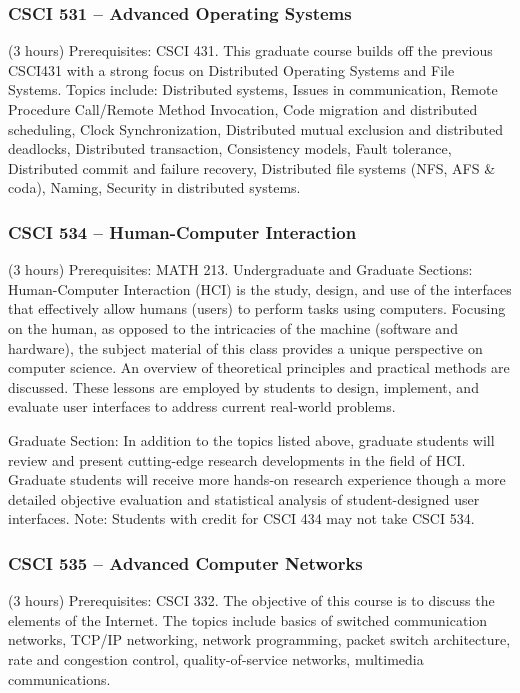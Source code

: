 \subsubsection{CSCI 531 -- Advanced Operating Systems}
(3 hours) Prerequisites: CSCI 431. This graduate course builds off the previous CSCI431 with a strong focus on Distributed Operating Systems and File Systems.  Topics include:  Distributed systems, Issues in communication, Remote Procedure Call/Remote Method Invocation, Code migration and distributed scheduling, Clock Synchronization, Distributed mutual exclusion and distributed deadlocks, Distributed transaction, Consistency models, Fault tolerance, Distributed commit and failure recovery, Distributed file systems (NFS, AFS \& coda), Naming, Security in distributed systems.

\subsubsection{CSCI 534 -- Human-Computer Interaction}
(3 hours) Prerequisites: MATH 213. Undergraduate and Graduate Sections: Human-Computer Interaction (HCI) is the study, design, and use of the interfaces that effectively allow humans (users) to perform tasks using computers. Focusing on the human, as opposed to the intricacies of the machine (software and hardware), the subject material of this class provides a unique perspective on computer science. An overview of theoretical principles and practical methods are discussed. These lessons are employed by students to design, implement, and evaluate user interfaces to address current real-world problems.

Graduate Section: In addition to the topics listed above, graduate students will review and present cutting-edge research developments in the field of HCI. Graduate students will receive more hands-on research experience though a more detailed objective evaluation and statistical analysis of student-designed user interfaces. Note: Students with credit for CSCI 434 may not take CSCI 534.

\subsubsection{CSCI 535 -- Advanced Computer Networks}
(3 hours) Prerequisites:  CSCI 332. The objective of this course is to discuss the elements of the Internet. The topics include basics of switched communication networks, TCP/IP networking, network programming, packet switch architecture, rate and congestion control, quality-of-service networks, multimedia communications. 

